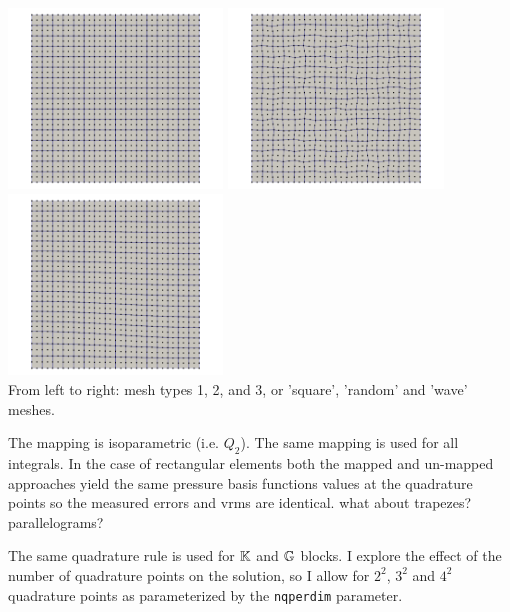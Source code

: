 \begin{center}
\includegraphics[width=5.7cm]{python_codes/fieldstone_76/results/mesh_type1}
\includegraphics[width=5.7cm]{python_codes/fieldstone_76/results/mesh_type2}
\includegraphics[width=5.7cm]{python_codes/fieldstone_76/results/mesh_type3}\\
{\captionfont From left to right: mesh types 1, 2, and 3, or 'square', 'random' 
and 'wave' meshes.}
\end{center}

The mapping is isoparametric (i.e. $Q_2$). The same mapping is used for all integrals.
In the case of rectangular elements both the mapped and un-mapped approaches 
yield the same pressure basis functions values at the quadrature points
so the measured errors and vrms are identical.
{\color{red} what about trapezes? parallelograms?} 

The same quadrature rule is used for ${\mathbb{K}}$ and ${\mathbb{G}}$ blocks.
I explore the effect of the number of quadrature points on the solution, 
so I allow for $2^2$, $3^2$ and $4^2$ quadrature points
as parameterized by the \lstinline{nqperdim} parameter. 

